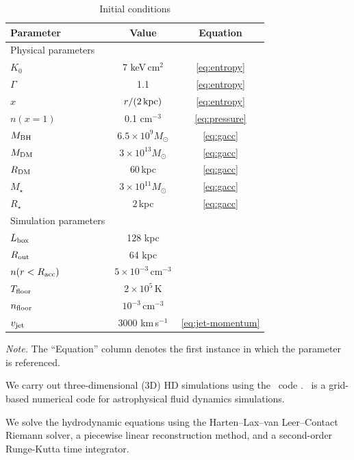 \begin{table}
\centering
\caption{Initial conditions\label{tab:initial-condition}}
\begin{tabular}{lcc}
\hline
\hline
Parameter & Value & Equation \\
\hline
Physical parameters & & \\
$K_0$ & 7 keV\,cm$^2$ & \ref{eq:entropy} \\
$\Gamma$ & 1.1 & \ref{eq:entropy}\\
$x$ & $r/(2\,\rm kpc)$ & \ref{eq:entropy} \\
$n (x=1)$ & 0.1 cm$^{-3}$ & \ref{eq:pressure} \\
$M_{\rm BH}$ & $6.5 \times 10^9 M_{\odot}$ & \ref{eq:gacc} \\
$M_{\rm DM}$ & $3 \times 10^{13} M_{\odot}$ & \ref{eq:gacc} \\
$R_{\rm DM}$ & $60$\,kpc & \ref{eq:gacc}\\
$M_{\star}$ & $3 \times 10^{11} M_{\odot}$ & \ref{eq:gacc} \\
$R_{\star}$ & $2$\,kpc & \ref{eq:gacc} \\
\hline
Simulation parameters & & \\
$L_{\rm box}$ & 128 kpc & \\
$R_{\rm out}$ & 64 kpc & \\
$n (r<R_{\rm acc})$ & $5 \times 10^{-3}$\,cm$^{-3}$ & \\
$T_{\rm floor}$ & $2\times10^5$\,K & \\
$n_{\rm floor}$ & $10^{-3}$\,cm$^{-3}$ & \\
$v_{\rm jet}$ & 3000 km\,s$^{-1}$ & \ref{eq:jet-momentum} \\
\hline
\end{tabular}
\parbox{0.6\linewidth}{\footnotesize \textit{Note.} The ``Equation'' column denotes the first instance in which the parameter is referenced.}
\end{table}



We carry out three-dimensional (3D) HD simulations using the \ath\ code \citep{stone_athena_2020}.
\ath~is a grid-based numerical code for astrophysical fluid dynamics simulations.

We solve the hydrodynamic equations using the Harten--Lax--van Leer--Contact Riemann solver, a piecewise linear reconstruction method, and a second-order Runge-Kutta time integrator.



